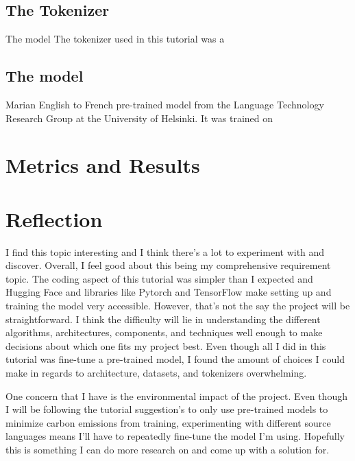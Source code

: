 \documentclass[10pt,twocolumn]{article}
\begin{document}
\subsection{The Tokenizer}
The model
The tokenizer used in this tutorial was a 

\subsection{The model}
Marian English to French pre-trained model from the Language Technology Research Group at the University of Helsinki. It was trained on 



\section{Metrics and Results}



\section{Reflection}
I find this topic interesting and I think there’s a lot to experiment with and discover. Overall, I feel good about this being my comprehensive requirement topic. The coding aspect of this tutorial was simpler than I expected and Hugging Face and libraries like Pytorch and TensorFlow make setting up and training the model very accessible. 
However, that's not the say the project will be straightforward. I think the difficulty will lie in understanding the different algorithms, architectures, components, and techniques well enough to make decisions about which one fits my project best. Even though all I did in this tutorial was fine-tune a pre-trained model, I found the amount of choices I could make in regards to architecture, datasets, and tokenizers overwhelming. 

One concern that I have is the environmental impact of the project. Even though I will be following the tutorial suggestion's to only use pre-trained models to minimize carbon emissions from training, experimenting with different source languages means I'll have to repeatedly fine-tune the model I'm using. Hopefully this is something I can do more research on and come up with a solution for. 
\end{document}
